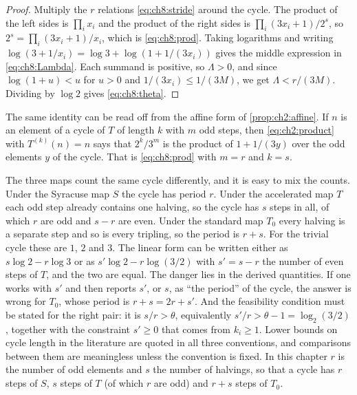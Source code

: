 \begin{proof}
Multiply the $r$ relations \eqref{eq:ch8:stride} around the cycle. The
product of the left sides is $\prod_ix_i$ and the product of the right sides
is $\prod_i(3x_i+1)/2^{s}$, so $2^s=\prod_i(3x_i+1)/x_i$, which is
\eqref{eq:ch8:prod}. Taking logarithms and writing
$\log(3+1/x_i)=\log3+\log(1+1/(3x_i))$ gives the middle expression in
\eqref{eq:ch8:Lambda}. Each summand is positive, so $\Lambda>0$, and since
$\log(1+u)<u$ for $u>0$ and $1/(3x_i)\leq1/(3M)$, we get
$\Lambda<r/(3M)$.
Dividing by $\log2$ gives \eqref{eq:ch8:theta}.
\end{proof}

The same identity can be read off from the affine form of
\cref{prop:ch2:affine}. If $n$ is an element of a cycle of $T$ of length $k$
with $m$ odd steps, then \eqref{eq:ch2:product} with $T^{(k)}(n)=n$ says that
$2^k/3^m$ is the product of $1+1/(3y)$ over the odd elements $y$ of the cycle.
That is \eqref{eq:ch8:prod} with $m=r$ and $k=s$.

\begin{remark}\label{rem:ch8:bookkeeping}
The three maps count the same cycle differently, and it is easy to mix the
counts. Under the Syracuse map $S$ the cycle has period $r$. Under the
accelerated map $T$ each odd step already contains one halving, so the cycle
has $s$ steps in all, of which $r$ are odd and $s-r$ are even. Under the
standard map $T_0$ every halving is a separate step and so is every tripling,
so the period is $r+s$. For the trivial cycle these are $1$, $2$ and $3$.
The linear form can be written either as $s\log2-r\log3$ or as
$s'\log2-r\log(3/2)$ with $s'=s-r$ the number of even steps of $T$, and the
two are equal. The danger lies in the derived quantities. If one works with
$s'$ and then reports $s'$, or $s$, as ``the period'' of the cycle, the
answer is wrong for $T_0$, whose period is $r+s=2r+s'$. And the feasibility
condition must be stated for the right pair: it is $s/r>\theta$, equivalently
$s'/r>\theta-1=\log_2(3/2)$, together with the constraint $s'\geq0$ that
comes from $k_i\geq1$. Lower bounds on cycle length in the literature are
quoted in all three conventions, and comparisons between them are meaningless
unless the convention is fixed. In this chapter $r$ is the number of odd
elements and $s$ the number of halvings, so that a cycle has $r$ steps of
$S$, $s$ steps of $T$ (of which $r$ are odd) and $r+s$ steps of $T_0$.
\end{remark}

